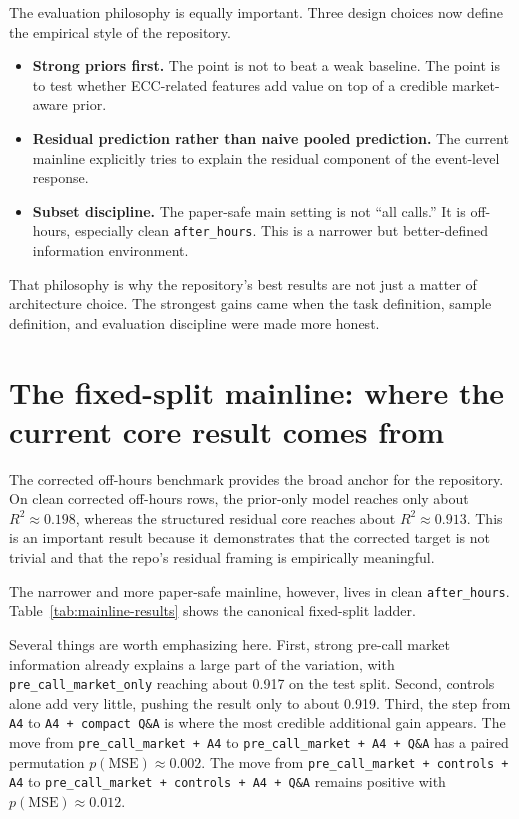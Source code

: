 \documentclass[acmsmall,screen,nonacm]{acmart}
\begin{document}
The evaluation philosophy is equally important. Three design choices now define the empirical style of the repository.

\begin{itemize}[leftmargin=1.5em]
    \item \textbf{Strong priors first.} The point is not to beat a weak baseline. The point is to test whether ECC-related features add value on top of a credible market-aware prior.
    \item \textbf{Residual prediction rather than naive pooled prediction.} The current mainline explicitly tries to explain the residual component of the event-level response.
    \item \textbf{Subset discipline.} The paper-safe main setting is not ``all calls.'' It is off-hours, especially clean \texttt{after\_hours}. This is a narrower but better-defined information environment.
\end{itemize}

That philosophy is why the repository's best results are not just a matter of architecture choice. The strongest gains came when the task definition, sample definition, and evaluation discipline were made more honest.

\section{The fixed-split mainline: where the current core result comes from}
The corrected off-hours benchmark provides the broad anchor for the repository. On clean corrected off-hours rows, the prior-only model reaches only about $R^2 \approx 0.198$, whereas the structured residual core reaches about $R^2 \approx 0.913$. This is an important result because it demonstrates that the corrected target is not trivial and that the repo's residual framing is empirically meaningful.

The narrower and more paper-safe mainline, however, lives in clean \texttt{after\_hours}. Table~\ref{tab:mainline-results} shows the canonical fixed-split ladder.



Several things are worth emphasizing here. First, strong pre-call market information already explains a large part of the variation, with \texttt{pre\_call\_market\_only} reaching about 0.917 on the test split. Second, controls alone add very little, pushing the result only to about 0.919. Third, the step from \texttt{A4} to \texttt{A4 + compact Q\&A} is where the most credible additional gain appears. The move from \texttt{pre\_call\_market + A4} to \texttt{pre\_call\_market + A4 + Q\&A} has a paired permutation $p(\mathrm{MSE}) \approx 0.002$. The move from \texttt{pre\_call\_market + controls + A4} to \texttt{pre\_call\_market + controls + A4 + Q\&A} remains positive with $p(\mathrm{MSE}) \approx 0.012$.
\end{document}
